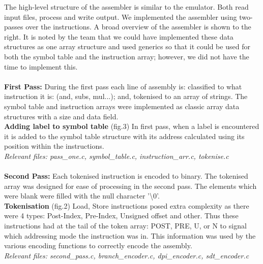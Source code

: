 \documentclass[11pt]{article}
\begin{document}
The high-level structure of the assembler is similar to the emulator. Both read input files, process and write output. We implemented the assembler using two-passes over the instructions. A broad overview of the assembler is shown to the right.  It is noted by the team that we could have implemented these data structures as one array structure and used generics so that it could be used for both the symbol table and the instruction array; however, we did not have the time to implement this.\\\\
\textbf{First Pass:} During the first pass each line of assembly is: classified to what instruction it is: (and, subs, mul...); and, tokenised to an array of strings. The symbol table and instruction arrays were implemented as classic array data structures with a size and data field.\\
\textbf{Adding label to symbol table} (fig.3) In first pass, when a label is encountered it is added to the symbol table structure with its address calculated using its position within the instructions.\\
\textit{Relevant files: pass\_one.c, symbol\_table.c, instruction\_arr.c, tokenise.c}\\
\\
\textbf{Second Pass:} Each tokenised instruction is encoded to binary. The tokenised array was designed for ease of processing in the second pass. The elements which were blank were filled with the null character '\textbackslash0'.
\\
\textbf{Tokenisation} (fig.2) Load, Store instructions posed extra complexity as there were 4 types: Post-Index, Pre-Index, Unsigned offset and other. Thus these instructions had at the tail of the token array: POST, PRE, U, or N to signal which addressing mode the instruction was in. This information was used by the various encoding functions to correctly encode the assembly.\\
\textit{Relevant files: second\_pass.c, branch\_encoder.c, dpi\_encoder.c, sdt\_encoder.c}\\
\\
\end{document}
